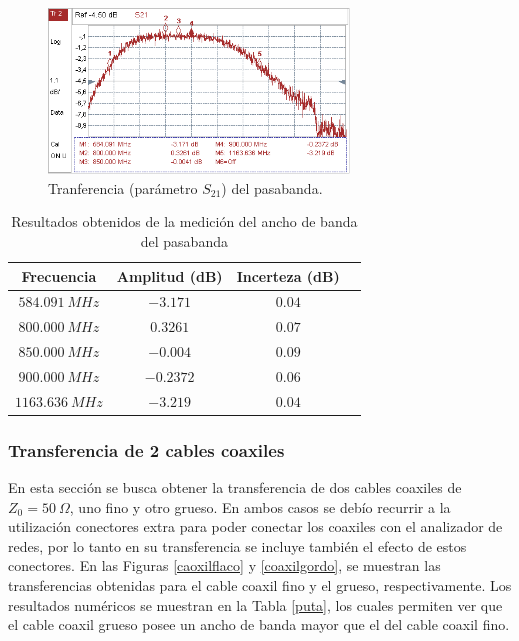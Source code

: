 \documentclass[a4paper,10pt]{article}
\begin{document}
		\begin{figure}[!htb]
				\centering
				\includegraphics[width=8cm]
				{Imagenes/transferenciapasabanda.PNG}
				\caption{Tranferencia (par\'ametro $S_{21}$) del pasabanda.}
				\label{transferenciabandpass} 
		\end{figure}
		
		\begin{table}[!htp]
			\centering
			\begin{tabular}{|c|c|c|c|}
				\hline
				Frecuencia & Amplitud (dB) & Incerteza (dB)\\
				\hline
				$584.091~MHz$ & $-3.171$ & $0.04$ \\
				$800.000~MHz$ & $0.3261$ & $0.07$ \\	
				$850.000~MHz$ & $-0.004$ & $0.09$ \\	
				$900.000~MHz$ & $-0.2372$ & $0.06$ \\
				$1163.636~MHz$ & $-3.219$ & $0.04$ \\	
									
			\end{tabular}
			\caption{Resultados obtenidos de la medici\'on del ancho de banda del pasabanda} \label{tablon}
		\end{table}	
		
		
		\subsubsection{Transferencia de 2 cables coaxiles}
		\indent En esta secci\'on se  busca obtener la transferencia de dos 
		cables coaxiles de $Z_0=50~\Omega$, uno fino y otro grueso. En ambos 
		casos se deb\'io recurrir a la utilizaci\'on conectores extra para 
		poder conectar los coaxiles con el analizador de redes, por lo tanto en 
		su transferencia se incluye tambi\'en el efecto de estos conectores. En 
		las Figuras \ref{caoxilflaco} y \ref{coaxilgordo}, se muestran las 
		transferencias obtenidas para el cable coaxil fino y el grueso, 
		respectivamente. Los resultados num\'ericos se muestran en la Tabla \ref{puta}, los cuales permiten ver que el cable coaxil grueso posee un ancho de banda mayor que el del cable coaxil fino.
		
\end{document}
